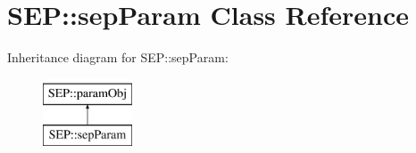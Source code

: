 \hypertarget{class_s_e_p_1_1sep_param}{}\section{S\+EP\+:\+:sep\+Param Class Reference}
\label{class_s_e_p_1_1sep_param}
Inheritance diagram for S\+EP\+:\+:sep\+Param\+:\begin{figure}[H]
\begin{center}
\leavevmode
\includegraphics[height=2.000000cm]{class_s_e_p_1_1sep_param}
\end{center}
\end{figure}
